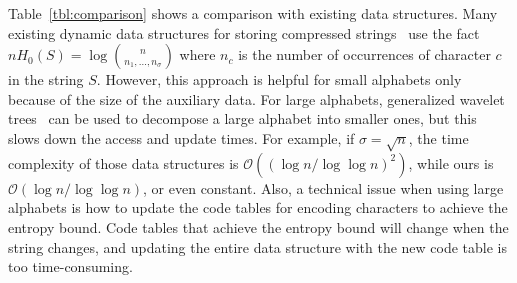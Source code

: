 \documentclass{llncs}
\newcommand{\Order}{\mathcal{O}}
\begin{document}
Table~\ref{tbl:comparison} shows a comparison with existing data structures.
Many existing dynamic data structures for storing compressed
strings~\cite{GNtcs09,HeMun10,MNtalg08,NavSad10}
use the fact $nH_0(S) = \log {{n}\choose{n_1,\ldots,n_\sigma}}$ where $n_c$
is the number of occurrences of character $c$ in the string $S$.
However, this approach is helpful for small alphabets only because of the size
of the auxiliary data.
For large alphabets, generalized wavelet trees~\cite{FMMNtalg07} can be used
to decompose a large alphabet into smaller ones, but this slows down the
access and update times.
For example, if $\sigma = \sqrt{n}$, the time complexity of those data
structures is $\Order((\log n/\log\log n)^2)$, 
while ours is $\Order(\log n/\log\log n)$, or even constant.
Also, a technical issue when using large alphabets is how to update the code
tables for encoding characters to achieve the entropy bound.
Code tables that achieve the entropy bound will change when the string
changes, and updating the entire data structure with the new code table is
too time-consuming.
\end{document}
